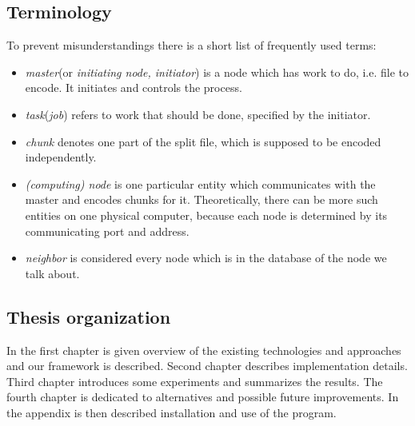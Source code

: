 \subsection*{Terminology}
To prevent misunderstandings there is a short list of frequently used terms:
\begin{itemize}
\item \textit{master}(or \textit{initiating node, initiator}) is a node which has work to do, i.e. file to encode. It initiates and controls the process.
\item \textit{task}(\textit{job}) refers to work that should be done, specified by the initiator.
\item \textit{chunk} denotes one part of the split file, which is supposed to be encoded independently.
\item \textit{(computing) node} is one particular entity which communicates with the master and encodes chunks for it. Theoretically, there can be more such entities on one physical computer, because each node is determined by its communicating port and address.
\item \textit{neighbor} is considered every node which is in the database of the node we talk about.
\end{itemize}

\subsection*{Thesis organization}
In the first chapter is given overview of the existing technologies and approaches and our framework is described. Second chapter describes implementation details. Third chapter introduces some experiments and summarizes the results. The fourth chapter is dedicated to alternatives and possible future improvements. In the appendix is then described installation and use of the program.